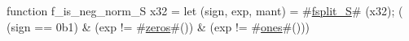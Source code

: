 function f_is_neg_norm_S   x32 = {
  let (sign, exp, mant) = #\hyperref[sailRISCVzfsplitzyS]{fsplit\_S}# (x32);
  (  (sign == 0b1)
   & (exp  != #\hyperref[sailRISCVzzzeros]{zeros}#())
   & (exp  != #\hyperref[sailRISCVzones]{ones}#()))
}
